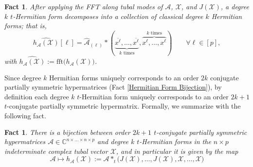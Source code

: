 \documentclass[11pt]{article}
\newtheorem{fact}[theorem]{Fact}
\begin{document}
\begin{fact}\label{Degree k t-Hermitian form as a collection of degree k Hermitian forms}
    After applying the FFT along tubal modes of $\mathcal{A}$, $\mathcal{X}$, and $J(\mathcal{X})$, a degree $k$ $t$-Hermitian form decomposes into a collection of classical degree $k$ Hermitian forms; that is, 
    \[\widehat{h_{\mathcal{A}}(\mathcal{X})}[\ell] = \widehat{\mathcal{A}}_{(\ell)}*\left(\underbrace{\overline{x^{\ell}},\dots,\overline{x^{\ell}}}_{k\text{ times}},\overbrace{x^{\ell},\dots,x^{\ell}}^{k\text{ times}}\right)\qquad \forall \ell\in [p],\]
    with $\widehat{h_{\mathcal{A}}(\mathcal{X})} := \mathrm{fft}\big(h_{\mathcal{A}}(\mathcal{X})\big)$. 
\end{fact}
Since degree $k$ Hermitian forms uniquely corresponds to an order $2k$ conjugate partially symmetric hypermatrices (Fact \ref{Hermitian Form Bijection}), by definition each degree $k$ $t$-Hermitian form uniquely corresponds to an order $2k+1$ $t$-conjugate partially symmetric hypermatrix. Formally, we summarize with the following fact. 
\begin{fact}\label{t-Hermitian Form Bijection}
    There is a bijection between order $2k+1$ $t$-conjugate partially symmetric hypermatrices $\mathcal{A}\in \mathbb{C}^{n\times\dots\times n\times p}$ and degree $k$ $t$-Hermitian forms in the $n\times p$ indeterminate complex tubal vector $\mathcal{X}$, and in particular it is given by the map 
    \[\mathcal{A}\mapsto h_{\mathcal{A}}(\mathcal{X}) := \mathcal{A}*_t\big(J(\mathcal{X}),\dots,J(\mathcal{X}),\mathcal{X},\dots,\mathcal{X}\big)\]
\end{fact}
\end{document}
